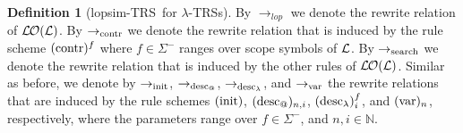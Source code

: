 \documentclass[
submission
]{dmtcs-episciences-tampered}
\makeatletter
\newcommand{\iap}[2]{#1 _{#2}}
\newcommand{\indap}[2]{#1 _{#2}}
\newcommand{\subap}[2]{#1 _{#2}}
\newcommand{\supap}[2]{#1 ^{#2}}
\newcommand{\bap}{\subap}
\newcommand{\pap}{\supap}
\newcommand{\pbap}[3]{#1 _{#3}^{#2}}
\newcommand{\nb}{\nobreakdash}
\newcommand{\nf}{\normalfont}
\newcommand{\nat}{\mathbb{N}}
\newcommand{\asig}{\Sigma}
\newcommand{\asigmin}{\supap{\asig}{-}}
\newcommand{\alTRS}{{\cal L}}
\newcommand{\TRS}{TRS}
\newcommand{\sfolapp}{@}
\newcommand{\sfonlabs}{\lambda}
\newcommand{\afoscopesym}{f}
\newcommand{\slop}{\textit{lop}}\newcommand{\slopstar}{\pap{\slop}{*}}
\newcommand{\lopsimTRS}{lopsim-TRS}
\newcommand{\sred}{\to}
\newcommand{\sredi}{\indap{\sred}}
\newcommand{\scriptsearch}{\text{\nf search}}
\newcommand{\scriptcontract}{\text{\nf contr}}
\newcommand{\scriptinit}{\text{\nf init}}
\newcommand{\scriptdescendinfolapp}{\iap{\text{\nf desc}}{\sfolapp}}
\newcommand{\scriptdescendinfolabs}{\iap{\text{\nf desc}}{\sfonlabs}}
\newcommand{\scriptvar}{\text{\nf var}}
\newcommand{\ssearchred}{\sredi{\scriptsearch}}
\newcommand{\scontractred}{\sredi{\scriptcontract}}
\newcommand{\slopsimred}{\sredi{\slop}}
\newcommand{\sinitred}{\sredi{\scriptinit}}
\newcommand{\sdescendinfolappred}{\sredi{\scriptdescendinfolapp}}
\newcommand{\sdescendinfolabsred}{\sredi{\scriptdescendinfolabs}}
\newcommand{\svarred}{\sredi{\scriptvar}}
\newcommand{\lTRS}{$\lambda$\hspace*{-0.5pt}\nb-\hspace*{-0.5pt}\TRS}
\newcommand{\lTRSs}{\lTRS{s}}
\theoremstyle{plain}
\theoremstyle{definition}
\newtheorem{definition}[theorem]{Definition}
\makeatother
\begin{document}
\begin{definition}[\lopsimTRS\ for \lTRSs]
  By $\slopsimred$ we denote the rewrite relation of $\lopsimTRSwrt{\alTRS}$.
  By $\scontractred$ we denote the rewrite relation that is induced by the rule scheme $\supap{(\scriptcontract)}{\afoscopesym}$
  where $\afoscopesym\in\asigmin$ ranges over scope symbols of $\alTRS$.  
By $\ssearchred$ we denote  
  the rewrite relation that is induced by the other rules of $\lopsimTRSwrt{\alTRS}$.
Similar as before,
  we denote by $\sinitred$, $\sdescendinfolappred$, $\sdescendinfolabsred$, and $\svarred$
  the rewrite relations that are induced by the rule schemes 
    $(\scriptinit)$, $\bap{(\scriptdescendinfolapp)}{n,i}$, $\pbap{(\scriptdescendinfolabs)}{\afoscopesym}{i}$, and $\bap{(\scriptvar)}{n}$, 
    respectively,
    where the parameters range over $\afoscopesym\in\asigmin$, and $n,i\in\nat$.
\end{definition} 
\end{document}
